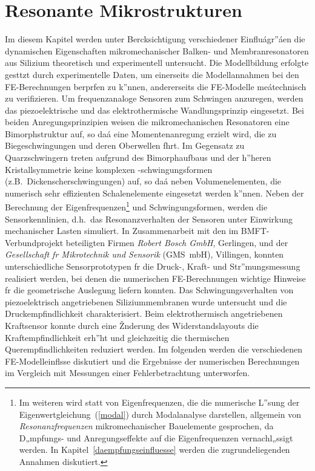 \chapter{Resonante Mikrostrukturen}
\label{schwingungsverhalten}

Im diesem Kapitel werden unter Bercksichtigung verschiedener
Einfluágr”áen die dynamischen Eigenschaften mikromechanischer
Balken- und Membranresonatoren aus Silizium
theoretisch und experimentell untersucht. Die Modellbildung
erfolgte gesttzt durch experimentelle Daten, um einerseits die
Modellannahmen bei den FE-Berechnungen berprfen zu k”nnen,
andererseits die FE-Modelle meátechnisch zu verifizieren.
Um fre\-quenzanaloge Sensoren zum Schwingen anzuregen, werden das
piezoelektrische und das elektrothermische Wandlungsprinzip eingesetzt.
Bei beiden Anregungsprinzipien weisen die mikromechanischen
Resonatoren eine Bimorphstruktur auf, so daá eine Momentenanregung erzielt
wird, die zu Biegeschwingungen und deren Oberwellen fhrt. Im Gegensatz
zu Quarzschwingern treten aufgrund des Bimorphaufbaus und der h”heren
Kristallsymmetrie keine komplexen -schwingungsformen
(z.B.\ Dickenscherschwingungen) auf, so daá neben Volumenelementen,
die numerisch sehr effizienten Schalenelemente eingesetzt werden k”nnen.
Neben der Berechnung der Eigenfrequenzen\footnote{Im weiteren wird statt
von Eigenfrequenzen, die die numerische L”sung der
Eigenwertgleichung~(\ref{modal}) durch Modalanalyse darstellen, allgemein
von {\em Resonanzfrequenzen} mikromechanischer Bauelemente gesprochen, da
D„mpfungs- und Anregungseffekte auf die Eigenfrequenzen vernachl„ssigt
werden. In Kapitel~\ref{daempfungseinfluesse} werden die zugrundeliegenden
Annahmen diskutiert.}
und Schwingungsformen, werden die
Sensorkennlinien, d.h.\ das Resonanzverhalten der Sensoren unter Einwirkung
mechanischer Lasten simuliert. In Zusammenarbeit mit den
im BMFT-Verbundprojekt beteiligten Firmen {\em Robert Bosch GmbH},
Gerlingen, und der {\em Gesellschaft fr Mikrotechnik und Sensorik}
(GMS~mbH), Villingen, konnten unterschiedliche
Sensorprototypen fr die Druck-, Kraft- und Str”mungsmessung
realisiert werden, bei denen die numerischen FE-Berechnungen
wichtige Hinweise fr die geometrische Auslegung liefern konnten.
Das Schwingungsverhalten von piezoelektrisch angetriebenen Siliziummembranen
wurde untersucht und die Druckempfindlichkeit charakterisiert.
Beim elektrothermisch angetriebenen Kraftsensor konnte durch eine
Žnderung des Widerstandslayouts die Kraftempfindlichkeit erh”ht und
gleichzeitig die thermischen Querempfindlichkeiten reduziert werden.
Im folgenden werden die verschiedenen FE-Modelleinflsse diskutiert
und die Ergebnisse der numerischen Berechnungen im Vergleich mit
Messungen einer Fehlerbetrachtung unterworfen.


